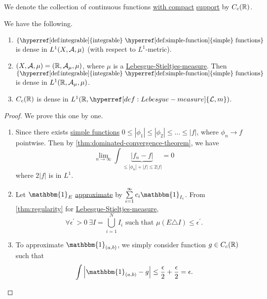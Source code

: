 \begin{notation}
	We denote the collection of continuous functions \underline{with compact} \hyperref[def:support]{support}
	by \(C_c(\mathbb{\MakeUppercase{r}} )\).
\end{notation}

\begin{theorem}
	We have the following.
	\begin{enumerate}
		\item \(\{\text{\hyperref[def:integrable]{integrable} \hyperref[def:simple-function]{simple} functions} \}\) is dense
		      in \(L^1(X, \mathcal{\MakeUppercase{a}} , \mu )\) (with respect to \(L^1\)-metric).
		\item \((X, \mathcal{\MakeUppercase{a}} , \mu ) = (\mathbb{\MakeUppercase{r}} , \mathcal{\MakeUppercase{a}} _\mu , \mu )\),
		      where \(\mu\) is a \hyperref[def:Lebesgue-Stieltjes-measure]{Lebesgue-Stieltjes-measure}. Then
		      \(\{\text{\hyperref[def:integrable]{integrable} \hyperref[def:simple-function]{simple} functions} \}\)
		      is dense in \(L^1(\mathbb{\MakeUppercase{r}} , \mathcal{\MakeUppercase{a}} _\mu , \mu )\).
		\item \(C_c(\mathbb{\MakeUppercase{r}} )\) is dense in \(L^1(\mathbb{\MakeUppercase{r}} , \hyperref[def:Lebesgue-measure]{\mathcal{\MakeUppercase{l}} , m})\).
	\end{enumerate}
\end{theorem}
\begin{proof}
	We prove this one by one.
	\begin{enumerate}
		\item Since there exists \hyperref[def:simple-function]{simple functions} \(0\leq \left\vert \phi _1 \right\vert \leq \left\vert \phi _2 \right\vert\leq \ldots \leq \left\vert f \right\vert  \),
		      where \(\phi _{n}\to f\) pointwise. Then by \autoref{thm:dominated-convergence-theorem}, we have
		      \[
			      \lim\limits_{n \to \infty} \int \underbrace{\left\vert f_{n} - f\right\vert }_{\leq \left\vert \phi _{n} \right\vert + \left\vert f  \right\vert\leq 2\left\vert f \right\vert } = 0
		      \]
		      where \(2\left\vert f \right\vert \) is in \(L^1\).
		\item Let \(\mathbbm{1}_{E} \) \underline{approximate} by \(\sum\limits_{i=1}^{\infty} c_{i}\mathbbm{1}_{I_{i}} \). From \autoref{thm:regularity} for
		      \hyperref[def:Lebesgue-Stieltjes-measure]{Lebesgue-Stieltjes-measure},
		      \[
			      \forall \epsilon ^\prime >0\ \exists I = \bigcup\limits_{i=1}^{N} I_{i}\text{ such that } \mu (E\triangle I)\leq \epsilon ^\prime .
		      \]
		\item To approximate \(\mathbbm{1}_{(a, b)} \), we simply consider function \(g\in C_c(\mathbb{\MakeUppercase{r}} )\) such that
		      \[
			      \int \left\vert \mathbbm{1}_{(a, b)} - g \right\vert \leq \frac{\epsilon}{2} + \frac{\epsilon}{2} = \epsilon .
		      \]
	\end{enumerate}
\end{proof}
